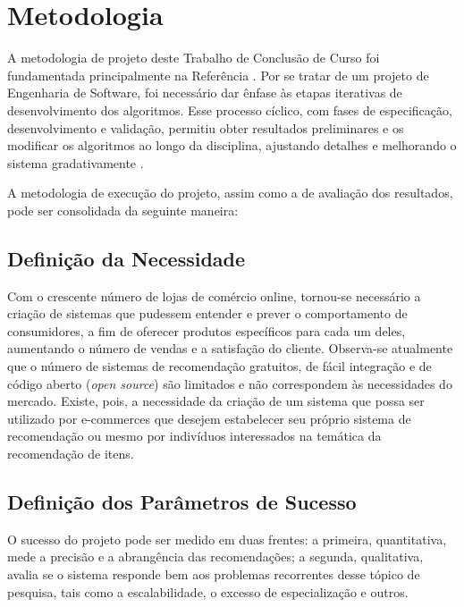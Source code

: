 \chapter[Metodologia]{Metodologia}
\label{chap:metodologia}

A metodologia de projeto deste Trabalho de Conclusão de Curso foi fundamentada principalmente na Referência . Por se tratar de um projeto de Engenharia de Software, foi necessário dar ênfase às etapas iterativas de desenvolvimento dos algoritmos. Esse processo cíclico, com fases de especificação, desenvolvimento e validação, permitiu obter resultados preliminares e os modificar os algoritmos ao longo da disciplina, ajustando detalhes e melhorando o sistema gradativamente \cite{iterative-development}.

A metodologia de execução do projeto, assim como a de avaliação dos resultados, pode ser consolidada da seguinte maneira: 

\section{Definição da Necessidade} %
\label{sec:defini_o_da_necessidade}


Com o crescente número de lojas de comércio online, tornou-se necessário a criação de sistemas que pudessem entender e prever o comportamento de consumidores, a fim de oferecer produtos específicos para cada um deles, aumentando o número de vendas e a satisfação do cliente. Observa-se atualmente que o número de sistemas de recomendação gratuitos, de fácil integração e de código aberto (\textit{open source}) são limitados e não correspondem às necessidades do mercado. Existe, pois, a necessidade da criação de um sistema que possa ser utilizado por e-commerces que desejem estabelecer seu próprio sistema de recomendação ou mesmo por indivíduos interessados na temática da recomendação de itens.

\section{Definição dos Parâmetros de Sucesso} %
\label{sec:defini_o_dos_par_metros_de_sucesso}


O sucesso do projeto pode ser medido em duas frentes: a primeira, quantitativa, mede a precisão e a abrangência das recomendações; a segunda, qualitativa, avalia se o sistema responde bem aos problemas recorrentes desse tópico de pesquisa, tais como a escalabilidade, o excesso de especialização e outros. 

